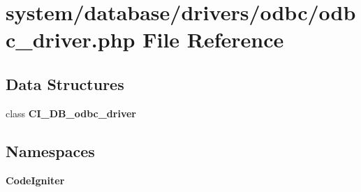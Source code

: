 \section{system/database/drivers/odbc/odbc\-\_\-driver.php File Reference}
\label{odbc__driver_8php}
\subsection*{Data Structures}
\begin{DoxyCompactItemize}
\item 
class {\bf C\-I\-\_\-\-D\-B\-\_\-odbc\-\_\-driver}
\end{DoxyCompactItemize}
\subsection*{Namespaces}
\begin{DoxyCompactItemize}
\item 
{\bf Code\-Igniter}
\end{DoxyCompactItemize}
